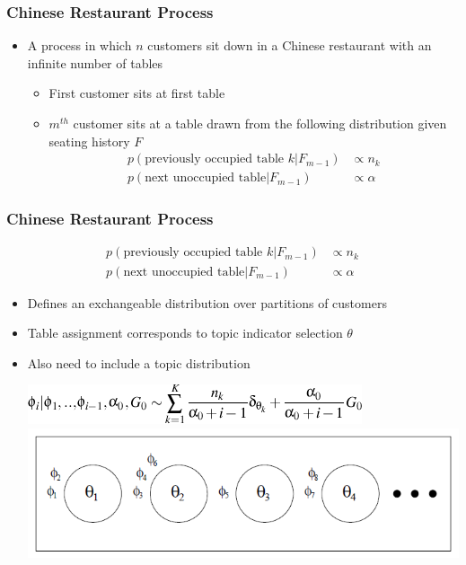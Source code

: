 \begin{frame}

	\frametitle{Chinese Restaurant Process}

	\begin{itemize}
		\item A process in which $n$ customers sit down in a Chinese restaurant with an infinite number of tables
		\begin{itemize}
			\item First customer sits at first table
			\item $m^{th}$ customer sits at a table drawn from the following distribution given seating history $F$
			\pause
			\begin{align*}
				p(\mbox{previously occupied table } k | F_{m-1}) & \propto n_k \\
				p(\mbox{next unoccupied table} | F_{m-1}) & \propto \alpha
			\end{align*}
		\end{itemize}
	\end{itemize}
\end{frame}

\begin{frame}
	\frametitle{Chinese Restaurant Process}

			\begin{align*}
				p(\mbox{previously occupied table } k | F_{m-1}) & \propto n_k \\
				p(\mbox{next unoccupied table} | F_{m-1}) & \propto \alpha
			\end{align*}

	\begin{itemize}
		\item Defines an exchangeable distribution over partitions of customers
		\item Table assignment corresponds to topic indicator selection $\theta$
		\item Also need to include a topic distribution

\begin{center}
\includegraphics[width=0.8\linewidth]{topic_models/equations/dirichlet_process} \\
\includegraphics[width=0.7\linewidth]{topic_models/crp}
\end{center}
\end{itemize}

\end{frame}

